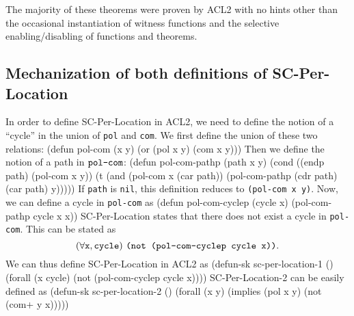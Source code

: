 \documentclass[]{eptcs}
\newenvironment{qv}
{\quote\Verbatim}
{\endVerbatim\endquote}
\begin{document}
The majority of these theorems were proven by ACL2 with no hints other than the occasional instantiation of witness functions and the selective enabling/disabling of functions and theorems.

\subsection{Mechanization of both definitions of SC-Per-Location}

In order to define SC-Per-Location in ACL2, we need to define the notion of a ``cycle'' in the union of \verb|pol| and \verb|com|. We first define the union of these two relations:
\begin{qv}
(defun pol-com (x y)
  (or (pol x y)
      (com x y)))
\end{qv}
Then we define the notion of a path in $\verb|pol-com|$:
\begin{qv}
(defun pol-com-pathp (path x y)
  (cond ((endp path) (pol-com x y))
        (t (and (pol-com x (car path))
                (pol-com-pathp (cdr path) (car path) y)))))
\end{qv}
If \verb|path| is \verb|nil|, this definition reduces to \verb|(pol-com x y)|. Now, we can define a cycle in \verb|pol-com| as
\begin{qv}
(defun pol-com-cyclep (cycle x)
  (pol-com-pathp cycle x x))
\end{qv}
SC-Per-Location states that there does not exist a cycle in \verb|pol-com|. This can be stated as 
\[
(\forall \verb|x|, \verb|cycle|) \text{  } \verb|(not (pol-com-cyclep cycle x))|.
\]
We can thus define SC-Per-Location in ACL2 as
\begin{qv}
(defun-sk sc-per-location-1 ()
  (forall (x cycle)
          (not (pol-com-cyclep cycle x))))
\end{qv}
SC-Per-Location-2 can be easily defined as
\begin{qv}
(defun-sk sc-per-location-2 ()
  (forall (x y)
          (implies (pol x y)
                   (not (com+ y x)))))
\end{qv}
\end{document}
